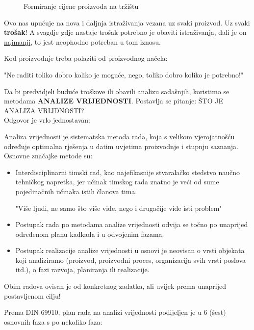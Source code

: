 \documentclass[a4paper,12pt]{article}
\numberwithin{figure}{section}
\begin{document}
\begin{figure}
\centering
 
\caption{Formiranje cijene proizvoda na tržištu}\label{Slika1}
\end{figure}
\FloatBarrier
\par
Ovo nas upućuje na nova i daljnja istraživanja vezana uz svaki proizvod. Uz svaki \textbf{trošak}! A svagdje gdje nastaje trošak potrebno je obaviti istraživanja, dali je on \underline{najmanji}, to jest neophodno potreban u tom iznosu.\par
Kod proizvodnje treba polaziti od proizvodnog načela:
\begin{center}
"Ne raditi toliko dobro koliko je moguće, nego, toliko dobro koliko je potrebno!"
\end{center}
\par
Da bi predvidjeli buduće troškove ili obavili analizu sadašnjih, koristimo se metodama \textbf{ANALIZE VRIJEDNOSTI}. Postavlja se pitanje: ŠTO JE ANALIZA VRIJDNOSTI?\\
Odgovor je vrlo jednostavan:\par
Analiza vrijednosti je sistematska metoda rada, koja s velikom vjerojatnošću određuje optimalna rješenja u datim uvjetima proizvodnje i stupnju saznanja. \\
Osnovne značajke metode su:
\begin{itemize}
\item Interdisciplinarni timski rad, kao najefikasnije stvaralačko stedstvo naučno tehničkog napretka, jer učinak timskog rada znatno je veći od sume pojedinačnih učinaka istih članova tima.
\begin{center}
"Više ljudi, ne samo što više vide, nego i drugačije vide isti problem"
\end{center}
\item Postupak rada po metodama analize vrijednosti odvija se točno po unaprijed  određenom planu kadkada i u odvojenim fazama.
\item Postupak realizacije analize vrijednosti u osnovi je neovisan o vrsti objekata koji analiziramo (proizvod, proizvodni proces, organizacija svih vrsti poslova itd.), o fazi razvoja, planiranja ili realizacije.
\end{itemize}
\par
Obim radova ovisan je od konkretnog zadatka, ali uvijek prema unaprijed postavljenom cilju!
\par
Prema DIN 69910, plan rada na analizi vrijednosti podijeljen je u 6 (šest) osnovnih faza s po nekoliko faza:
\end{document}
